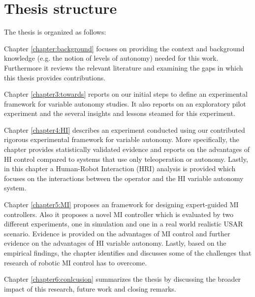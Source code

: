 \documentclass[a4paper,12pt,oneside,openright]{bhamthesis}
\begin{document}
\section{Thesis structure}
The thesis is organized as follows:

Chapter \ref{chapter:background} focuses on providing the context and background knowledge (e.g. the notion of levels of autonomy) needed for this work. Furthermore it reviews the relevant literature and examining the gaps in which this thesis provides contributions.

Chapter \ref{chapter3:towards} reports on our initial steps to define an experimental framework for variable autonomy studies. It also reports on an exploratory pilot experiment and the several insights and lessons steamed for this experiment.

Chapter \ref{chapter4:HI} describes an experiment conducted using our contributed rigorous experimental framework for variable autonomy. More specifically, the chapter provides statistically validated evidence and reports on the advantages of HI control compared to systems that use only teleoperation or autonomy. Lastly, in this chapter a Human-Robot Interaction (HRI) analysis is provided which focuses on the interactions between the operator and the HI variable autonomy system.

Chapter \ref{chapter5:MI} proposes an framework for designing expert-guided MI controllers. Also it proposes a novel MI controller which is evaluated by two different experiments, one in simulation and one in a real world realistic USAR scenario. Evidence is provided on the advantages of MI control and further evidence on the advantages of HI variable autonomy. Lastly, based on the empirical findings, the chapter identifies and discusses some of the challenges that research of robotic MI control has to overcome.

Chapter \ref{chapter6:conlcusion} summarizes the thesis by discussing the broader impact of this research, future work and closing remarks.



\end{document}
